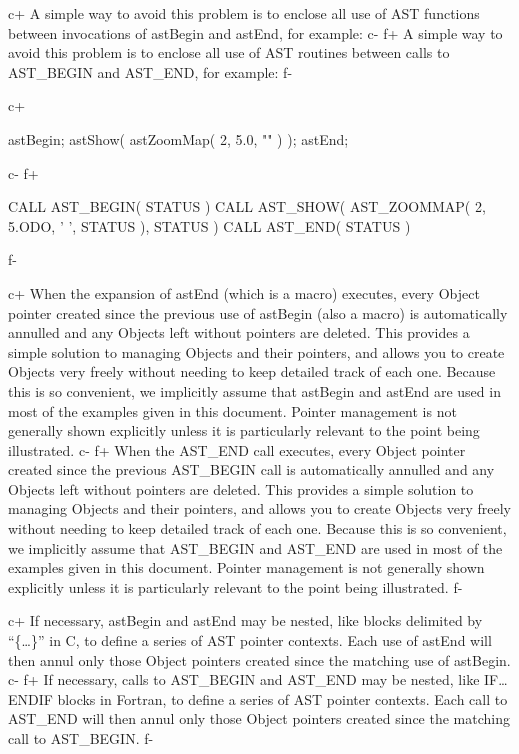 \documentclass[twoside,11pt]{starlink}
\begin{document}
c+
A simple way to avoid this problem is to enclose all use of AST
functions between invocations of astBegin and astEnd, for example:
c-
f+
A simple way to avoid this problem is to enclose all use of AST
routines between calls to AST\_BEGIN and AST\_END, for example:
f-

c+
\small
\begin{terminalv}
astBegin;
astShow( astZoomMap( 2, 5.0, "" ) );
astEnd;
\end{terminalv}
\normalsize
c-
f+
\small
\begin{terminalv}
      CALL AST_BEGIN( STATUS )
      CALL AST_SHOW( AST_ZOOMMAP( 2, 5.ODO, ' ', STATUS ), STATUS )
      CALL AST_END( STATUS )
\end{terminalv}
\normalsize
f-

c+
When the expansion of astEnd (which is a macro) executes, every Object
pointer created since the previous use of astBegin (also a macro) is
automatically annulled and any Objects left without pointers are
deleted. This provides a simple solution to managing Objects and their
pointers, and allows you to create Objects very freely without needing
to keep detailed track of each one.  Because this is so convenient, we
implicitly assume that astBegin and astEnd are used in most of the
examples given in this document.  Pointer management is not generally
shown explicitly unless it is particularly relevant to the point being
illustrated.
c-
f+
When the AST\_END call executes, every Object pointer created since
the previous AST\_BEGIN call is automatically annulled and any Objects
left without pointers are deleted. This provides a simple solution to
managing Objects and their pointers, and allows you to create Objects
very freely without needing to keep detailed track of each one.
Because this is so convenient, we implicitly assume that AST\_BEGIN
and AST\_END are used in most of the examples given in this document.
Pointer management is not generally shown explicitly unless it is
particularly relevant to the point being illustrated.
f-

c+
If necessary, astBegin and astEnd may be nested, like blocks delimited
by ``\{\ldots\}'' in C, to define a series of AST pointer
contexts. Each use of astEnd will then annul only those Object
pointers created since the matching use of astBegin.
c-
f+
If necessary, calls to AST\_BEGIN and AST\_END may be nested, like
IF\ldots ENDIF blocks in Fortran, to define a series of AST pointer
contexts. Each call to AST\_END will then annul only those Object
pointers created since the matching call to AST\_BEGIN.
f-
\end{document}
